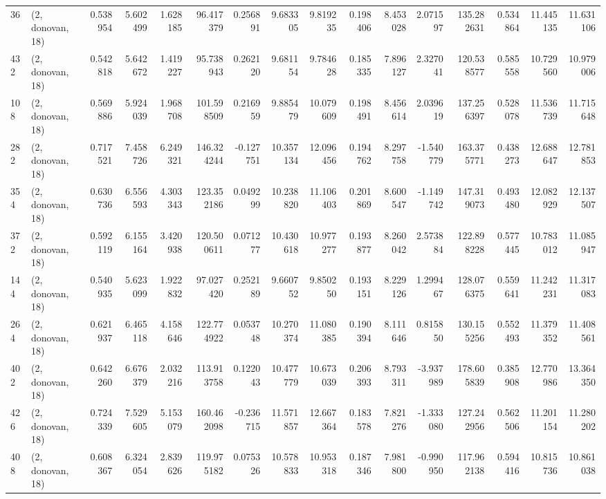 \begin{tabular}{llrrrrrrrrrrrrrr}
36  &  (2, donovan, 18) &   0.538954 &   5.602499 &   1.628185 &    96.417379 &   0.256891 &   9.683305 &   9.819235 &  0.198406 &   8.453028 &   2.071597 &   135.282631 &   0.534864 &  11.445135 &  11.631106 \\
432 &  (2, donovan, 18) &   0.542818 &   5.642672 &   1.419227 &    95.738943 &   0.262120 &   9.681154 &   9.784628 &  0.185335 &   7.896127 &   2.327041 &   120.538577 &   0.585558 &  10.729560 &  10.979006 \\
108 &  (2, donovan, 18) &   0.569886 &   5.924039 &   1.968708 &   101.598509 &   0.216959 &   9.885479 &  10.079609 &  0.198491 &   8.456614 &   2.039619 &   137.256397 &   0.528078 &  11.536739 &  11.715648 \\
282 &  (2, donovan, 18) &   0.717521 &   7.458726 &   6.249321 &   146.324244 &  -0.127751 &  10.357134 &  12.096456 &  0.194762 &   8.297758 &  -1.540779 &   163.375771 &   0.438273 &  12.688647 &  12.781853 \\
354 &  (2, donovan, 18) &   0.630736 &   6.556593 &   4.303343 &   123.352186 &   0.049299 &  10.238820 &  11.106403 &  0.201869 &   8.600547 &  -1.149742 &   147.319073 &   0.493480 &  12.082929 &  12.137507 \\
372 &  (2, donovan, 18) &   0.592119 &   6.155164 &   3.420938 &   120.500611 &   0.071277 &  10.430618 &  10.977277 &  0.193877 &   8.260042 &   2.573884 &   122.898228 &   0.577445 &  10.783012 &  11.085947 \\
144 &  (2, donovan, 18) &   0.540935 &   5.623099 &   1.922832 &    97.027420 &   0.252189 &   9.660752 &   9.850250 &  0.193151 &   8.229126 &   1.299467 &   128.076375 &   0.559641 &  11.242231 &  11.317083 \\
264 &  (2, donovan, 18) &   0.621937 &   6.465118 &   4.158646 &   122.774922 &   0.053748 &  10.270374 &  11.080385 &  0.190394 &   8.111646 &   0.815850 &   130.155256 &   0.552493 &  11.379352 &  11.408561 \\
402 &  (2, donovan, 18) &   0.642260 &   6.676379 &   2.032216 &   113.913758 &   0.122043 &  10.477779 &  10.673039 &  0.206393 &   8.793311 &  -3.937989 &   178.605839 &   0.385908 &  12.770986 &  13.364350 \\
426 &  (2, donovan, 18) &   0.724339 &   7.529605 &   5.153079 &   160.462098 &  -0.236715 &  11.571857 &  12.667364 &  0.183578 &   7.821276 &  -1.333080 &   127.242956 &   0.562506 &  11.201154 &  11.280202 \\
408 &  (2, donovan, 18) &   0.608367 &   6.324054 &   2.839626 &   119.975182 &   0.075326 &  10.578833 &  10.953318 &  0.187346 &   7.981800 &  -0.990950 &   117.962138 &   0.594416 &  10.815736 &  10.861038 \\

\end{tabular}

